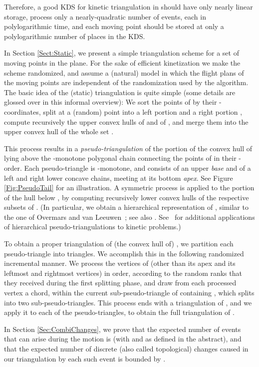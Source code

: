\documentclass[11pt]{article}
\begin{document}
Therefore, a good KDS for 
kinetic triangulation in  should have only nearly linear storage, process only a nearly-quadratic number of events, each in polylogarithmic time, and each moving point should be stored at only a polylogarithmic number of places in the KDS.


\medskip
{}
In Section \ref{Sect:Static}, we present a simple triangulation scheme for a set  of  moving
points in the plane. For the sake of efficient kinetization we make
the scheme randomized, and assume a (natural) model in which the flight plans of
the moving points are independent of the randomization used by the
algorithm. The basic idea of the (static) triangulation is quite
simple (some details are glossed over in this informal overview):
We sort the points of  by their -coordinates, split  at a
(random) point  into a left portion  and a right portion
, compute recursively the upper convex hulls of
 and of , and merge them into 
the upper convex hull of the whole set .

This process results in a {\em pseudo-triangulation} of the portion 
of the convex hull of  lying above the -monotone polygonal chain  
connecting the points of  in their -order. Each pseudo-triangle is
-monotone, and consists of an upper {\em base} and of a left and
right lower concave chains, meeting at its bottom {\em apex}. See
Figure \ref{Fig:PseudoTail} for an illustration.
A symmetric process is applied to the portion of the hull below 
, by computing recursively lower convex hulls of the
respective subsets of .
(In particular, we obtain a hierarchical representation of , similar to the one of Overmars and van
Leeuwen~\cite{Overmars}; see also \cite{AKS}. See~\cite{ABG,TwoPolyg04,Speckmann} for additional applications of hierarchical pseudo-triangulations to kinetic problems.)

To obtain a proper triangulation of (the convex hull of) , we partition each
pseudo-triangle  into triangles. 
We accomplish this in the
following randomized incremental manner. We process the vertices
of  (other than its apex and its leftmost and rightmost 
vertices) in order, according to the random ranks that they received
during the first splitting phase, and draw from each processed
vertex  a chord, within the current sub-pseudo-triangle 
of  containing , which splits  into two
sub-pseudo-triangles. This process ends with a triangulation of 
, and we apply it to each of the pseudo-triangles, to obtain the full triangulation of .

In Section \ref{Sec:CombiChanges}, we prove that the expected number of events that
can arise during the motion is  (with  and  as defined in the abstract), and that the expected number of discrete (also called topological) changes caused in our triangulation by each such event is bounded by .
\end{document}
